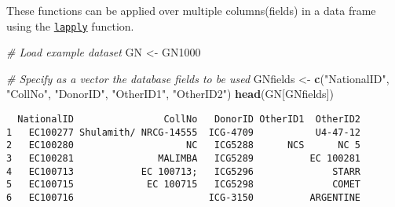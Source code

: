 \documentclass[]{article}
\newenvironment{Shaded}{\begin{snugshade}}{\end{snugshade}}
\newcommand{\CommentTok}[1]{\textcolor[rgb]{0.56,0.35,0.01}{\textit{#1}}}
\newcommand{\KeywordTok}[1]{\textcolor[rgb]{0.13,0.29,0.53}{\textbf{#1}}}
\newcommand{\NormalTok}[1]{#1}
\newcommand{\StringTok}[1]{\textcolor[rgb]{0.31,0.60,0.02}{#1}}
\begin{document}
These functions can be applied over multiple columns(fields) in a data
frame using the
\href{http://google.com/\#q=\%5BR\%5D+lapply}{\texttt{lapply}} function.

\begin{Shaded}
\begin{Highlighting}[]
\CommentTok{# Load example dataset}
\NormalTok{GN <-}\StringTok{ }\NormalTok{GN1000}

\CommentTok{# Specify as a vector the database fields to be used}
\NormalTok{GNfields <-}\StringTok{ }\KeywordTok{c}\NormalTok{(}\StringTok{"NationalID"}\NormalTok{, }\StringTok{"CollNo"}\NormalTok{, }\StringTok{"DonorID"}\NormalTok{, }\StringTok{"OtherID1"}\NormalTok{, }\StringTok{"OtherID2"}\NormalTok{)}
\KeywordTok{head}\NormalTok{(GN[GNfields])}
\end{Highlighting}
\end{Shaded}

\begin{verbatim}
  NationalID                CollNo   DonorID OtherID1  OtherID2
1   EC100277 Shulamith/ NRCG-14555  ICG-4709           U4-47-12
2   EC100280                    NC   ICG5288      NCS      NC 5
3   EC100281               MALIMBA   ICG5289          EC 100281
4   EC100713            EC 100713;   ICG5296              STARR
5   EC100715             EC 100715   ICG5298              COMET
6   EC100716                        ICG-3150          ARGENTINE
\end{verbatim}
\end{document}

